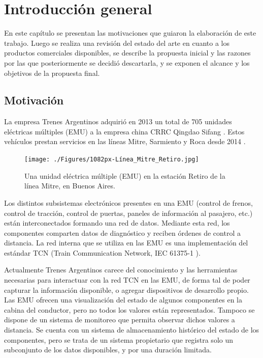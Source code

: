 \chapter{Introducción general}

En este capítulo se presentan las motivaciones que guiaron la elaboración de este trabajo. Luego se realiza una revisión del estado del arte en cuanto a los productos comerciales disponibles, se describe la propuesta inicial y las razones por las que posteriormente se decidió descartarla, y se exponen el alcance y los objetivos de la propuesta final.

\label{cap:IntroGeneral}

\section{Motivación}

La empresa Trenes Argentinos \cite{web:sofse} adquirió en 2013 un total de 705 unidades eléctricas múltiples (EMU) a la empresa china CRRC Qingdao Sifang \cite{web:sifang} \cite{licitacion1}. Estos vehículos prestan servicios en las líneas Mitre, Sarmiento y Roca desde 2014 \cite{emu:roca} \cite{emu:mitre-sarmiento}.


\begin{figure}[htbp]
	\centering
	\texttt{[image: ./Figures/1082px-Línea\_Mitre\_Retiro.jpg]}
	\caption[Unidad eléctrica múltiple (EMU)]{Una unidad eléctrica múltiple (EMU) en la estación Retiro de la línea Mitre, en Buenos Aires.\footnotemark}
	\label{fig:emu}
\end{figure}

Los distintos subsistemas electrónicos presentes en una EMU (control de frenos, control de tracción, control de puertas, paneles de información al pasajero, etc.) están interconectados formando una red de datos. Mediante esta red, los componentes comparten datos de diagnóstico y reciben órdenes de control a distancia. La red interna que se utiliza en las EMU es una implementación del estándar TCN (Train Communication Network, IEC 61375-1 \cite{iec61375-1}).

Actualmente Trenes Argentinos carece del conocimiento y las herramientas necesarias para interactuar con la red TCN en las EMU, de forma tal de poder capturar la información disponible, o agregar dispositivos de desarrollo propio.
Las EMU ofrecen una visualización del estado de algunos componentes en la cabina del conductor, pero no todos los valores están representados.
Tampoco se dispone de un sistema de monitoreo que permita observar dichos valores a distancia.
Se cuenta con un sistema de almacenamiento histórico del estado de los componentes, pero se trata de un sistema propietario que registra solo un subconjunto de los datos disponibles, y por una duración limitada.


